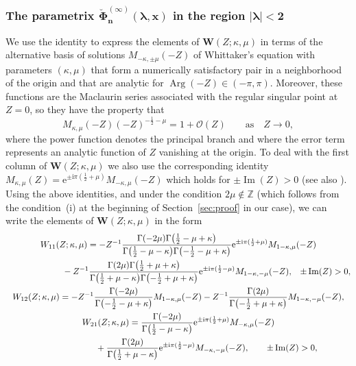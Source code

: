 \documentclass[pdftex]{sigma}
\numberwithin{equation}{section}
\newcommand{\ee}{\mathrm{e}}
\newcommand{\ii}{\mathrm{i}}
\newcommand{\para}[1]{\breve{#1}}
\newcommand{\Z}{{\mathbb{Z}}}
\newcommand{\im}{\operatorname{Im}}
\renewcommand{\arg}{\operatorname{Arg}}
\begin{document}
\subsubsection[The parametrix Phi\^(infty)\_n(lambda,x) in the region lambda less than 2 in absolute value]{The parametrix $\boldsymbol{\para{\boldsymbol{\Phi}}^{(\infty)}_n(\lambda,x)}$ in the region $\boldsymbol{|\lambda|<2}$}

We use the identity \cite[equation~(13.14.33)]{DLMF} to express the elements of $\mathbf{W}(Z;\kappa,\mu)$ in terms of the alternative basis of solutions $M_{-\kappa,\pm\mu}(-Z)$ of Whittaker's equation with parameters $(\kappa,\mu)$ that form a numerically satisfactory pair in a neighborhood of the origin and that are analytic for $\arg(-Z)\in (-\pi,\pi)$. Moreover, these functions are the Maclaurin series associated with the regular singular point at $Z=0$, so they have the property that
\begin{equation}
M_{\kappa,\mu}(-Z)(-Z)^{-\frac{1}{2}-\mu} = 1+\mathcal{O}(Z) \qquad \text{as} \quad Z\to 0,
\label{eq:WhittakerM-near-origin}
\end{equation}
where the power function denotes the principal branch and where the error term represents an analytic function of $Z$ vanishing at the origin. To deal with the first column of $\mathbf{W}(Z;\kappa,\mu)$ we also use the corresponding identity $M_{\kappa,\mu}(Z)=\ee^{\pm \ii\pi(\frac{1}{2}+\mu)}M_{-\kappa,\mu}(-Z)$ which holds for $\pm\im(Z)>0$ (see also \cite[equation~(13.14.10)]{DLMF}).
Using the above identities, and under the condition $2\mu \not \in \Z$ (which follows from the condition~(i) at the beginning of Section~\ref{sec:proof} in our case), we can write the elements of $\mathbf{W}(Z;\kappa,\mu)$ in the form
\begin{gather*}\nonumber
 W_{11}(Z;\kappa,\mu)= -Z^{-1}\frac{\Gamma(-2\mu)\Gamma\big(\frac{1}{2}-\mu+\kappa\big)}{\Gamma\big(\frac{1}{2}-\mu-\kappa\big)\Gamma\bigl(-\frac{1}{2}-\mu+\kappa\bigr)}\ee^{\pm \ii\pi(\frac{1}{2}+\mu)}M_{1-\kappa,\mu}(-Z)\\
\hphantom{W_{11}(Z;\kappa,\mu)=}{}
-Z^{-1}\frac{\Gamma(2\mu)\Gamma\big(\frac{1}{2}+\mu+\kappa\big)}{\Gamma\big(\frac{1}{2}+\mu-\kappa\big)\Gamma\bigl(-\frac{1}{2}+\mu+\kappa\bigr)}
\ee^{\pm \ii\pi(\frac{1}{2}-\mu)}M_{1-\kappa,-\mu}(-Z),\quad\! \pm\im(Z)>0,\\
 W_{12}(Z;\kappa,\mu)= -Z^{-1}\frac{\Gamma(-2\mu)}{\Gamma\bigl(-\frac{1}{2}-\mu+\kappa\bigr)}M_{1-\kappa,\mu}(-Z)-Z^{-1}\frac{\Gamma(2\mu)}{\Gamma\bigl({-}\frac{1}{2}+\mu+\kappa\bigr)}M_{1-\kappa,-\mu}(-Z),\\
 W_{21}(Z;\kappa,\mu)= \frac{\Gamma(-2\mu)}{\Gamma\big(\frac{1}{2}-\mu-\kappa\big)}\ee^{\pm \ii\pi (\frac{1}{2}+\mu)}M_{-\kappa,\mu}(-Z)\\
 \hphantom{W_{21}(Z;\kappa,\mu)= }{}
 +
 \frac{\Gamma(2\mu)}{\Gamma\big(\frac{1}{2}+\mu-\kappa\big)}\ee^{\pm \ii\pi(\frac{1}{2}-\mu)}M_{-\kappa,-\mu}(-Z),\qquad\pm\im(Z)>0,
\end{gather*}%
\end{document}
